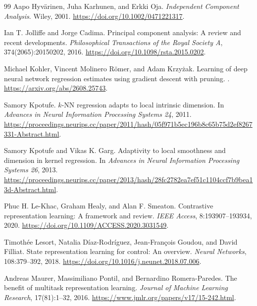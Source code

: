 \documentclass[11pt,twoside]{article}
\theoremstyle{definition}
\theoremstyle{remark}
\begin{document}
\begin{thebibliography}{99}
Aapo Hyv\"arinen, Juha Karhunen, and Erkki Oja.
\newblock \emph{Independent Component Analysis}.
\newblock Wiley, 2001.
\newblock \url{https://doi.org/10.1002/0471221317}.

Ian T. Jolliffe and Jorge Cadima.
\newblock Principal component analysis: A review and recent developments.
\newblock \emph{Philosophical Transactions of the Royal Society A},
374(2065):20150202, 2016.
\newblock \url{https://doi.org/10.1098/rsta.2015.0202}.

Michael Kohler, Vincent Molinero R\"omer, and Adam Krzy\.{z}ak.
\newblock Learning of deep neural network regression estimates using gradient
descent with pruning.
.
\newblock \url{https://arxiv.org/abs/2608.25743}.

Samory Kpotufe.
\newblock $k$-NN regression adapts to local intrinsic dimension.
\newblock In \emph{Advances in Neural Information Processing Systems 24},
2011.
\newblock \url{https://proceedings.neurips.cc/paper/2011/hash/05f971b5ec196b8c65b75d2ef8267331-Abstract.html}.

Samory Kpotufe and Vikas K. Garg.
\newblock Adaptivity to local smoothness and dimension in kernel regression.
\newblock In \emph{Advances in Neural Information Processing Systems 26},
2013.
\newblock \url{https://proceedings.neurips.cc/paper/2013/hash/28fc2782ea7ef51c1104ccf7b9bea13d-Abstract.html}.

Phuc H. Le-Khac, Graham Healy, and Alan F. Smeaton.
\newblock Contrastive representation learning: A framework and review.
\newblock \emph{IEEE Access}, 8:193907--193934, 2020.
\newblock \url{https://doi.org/10.1109/ACCESS.2020.3031549}.

Timoth\'ee Lesort, Natalia D\'iaz-Rodr\'iguez, Jean-Fran\c{c}ois Goudou, and
David Filliat.
\newblock State representation learning for control: An overview.
\newblock \emph{Neural Networks}, 108:379--392, 2018.
\newblock \url{https://doi.org/10.1016/j.neunet.2018.07.006}.

Andreas Maurer, Massimiliano Pontil, and Bernardino Romera-Paredes.
\newblock The benefit of multitask representation learning.
\newblock \emph{Journal of Machine Learning Research}, 17(81):1--32, 2016.
\newblock \url{https://www.jmlr.org/papers/v17/15-242.html}.


\end{thebibliography}
\end{document}
